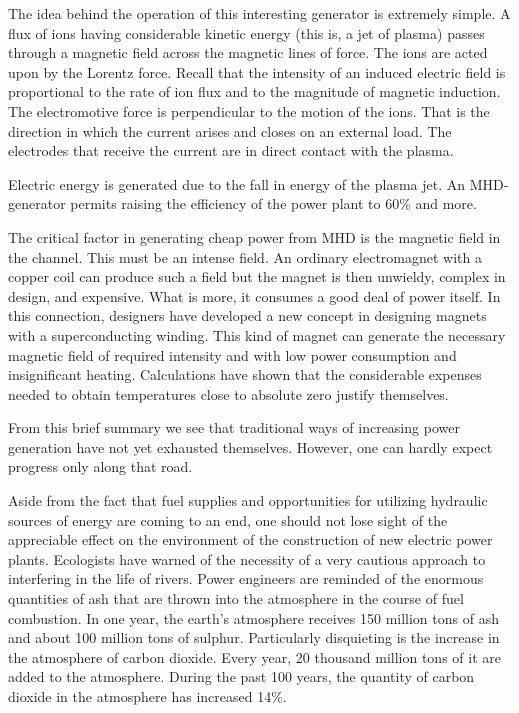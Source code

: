 The idea behind the operation of this interesting gen­erator is extremely simple. A flux of ions having con­siderable kinetic energy (this is, a jet of plasma) passes through a magnetic field across the magnetic lines of force. The ions are acted upon by the Lorentz force. Recall that the intensity of an induced electric field is propor­tional to the rate of ion flux and to the magnitude of magnetic induction. The electromotive force is perpen­dicular to the motion of the ions. That is the direction in which the current arises and closes on an external load. The electrodes that receive the current are in direct contact with the plasma.

Electric energy is generated due to the fall in energy of the plasma jet. An MHD-generator permits raising the efficiency of the power plant to 60\% and more.

The critical factor in generating cheap power from MHD is the magnetic field in the channel. This must be an intense field. An ordinary electromagnet with a copper coil can produce such a field but the magnet is then un­wieldy, complex in design, and expensive. What is more, it consumes a good deal of power itself. In this connection, designers have developed a new concept in designing magnets with a superconducting winding. This kind of magnet can generate the necessary magnetic field of re­quired intensity and with low power consumption and insignificant heating. Calculations have shown that the considerable expenses needed to obtain temperatures close to absolute zero justify themselves.

From this brief summary we see that traditional ways of increasing power generation have not yet exhausted themselves. However, one can hardly expect progress only along that road.

Aside from the fact that fuel supplies and opportunities for utilizing hydraulic sources of energy are coming to an end, one should not lose sight of the appreciable effect on the environment of the construction of new electric power plants. Ecologists have warned of the necessity of a very cautious approach to interfering in the life of rivers. Power engineers are reminded of the enormous quantities of ash that are thrown into the atmosphere in the course of fuel combustion. In one year, the earth's atmosphere receives 150 million tons of ash and about 100 million tons of sulphur. Particularly disquieting is the increase in the atmosphere of carbon dioxide. Every year, 20 thousand million tons of it are added to the atmosphere. During the past 100 years, the quantity of carbon dioxide in the atmosphere has increased 14\%.

